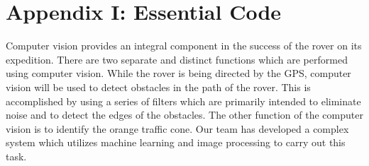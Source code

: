 \documentclass[10pt,letterpaper,onecolumn,draftclsnofoot,journal]{IEEEtran}
\begin{document}
\section{\textbf{Appendix I: Essential Code}}
Computer vision provides an integral component in the success of the rover on its expedition. There are two separate and distinct functions which are performed using computer vision. While the rover is being directed by the GPS, computer vision will be used to detect obstacles in the path of the rover. This is accomplished by using a series of filters which are primarily intended to eliminate noise and to detect the edges of the obstacles. The other function of the computer vision is to identify the orange traffic cone. Our team has developed a complex system which utilizes machine learning and image processing to carry out this task.\vspace{.3cm}
\par
\end{document}
